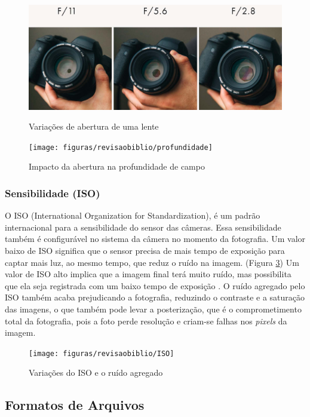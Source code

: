 \begin{figure}[!htb]
	\centering
	\caption{Variações de abertura de uma lente}
	\includegraphics[width=0.7\linewidth]{figuras/revisaobiblio/abertura}
	\label{fig:abertura}
\end{figure}

\begin{figure}[h]
	\centering
	\caption{Impacto da abertura na profundidade de campo}
	\texttt{[image: figuras/revisaobiblio/profundidade]}
	\label{fig:profundidade}
\end{figure}

\subsubsection{Sensibilidade (ISO)}


O ISO (International Organization for Standardization), é um padrão internacional para a sensibilidade do sensor das câmeras. Essa sensibilidade também é configurável no sistema da câmera no momento da fotografia. Um valor baixo de ISO significa que o sensor precisa de mais tempo de exposição para captar mais luz, ao mesmo tempo, que reduz o ruído na imagem. (Figura \ref{fig:iso})
Um valor de ISO alto implica que a imagem final terá muito ruído, mas possibilita que ela seja registrada com um baixo tempo de exposição \cite{book:bbcsky}. O ruído agregado pelo ISO também acaba prejudicando a fotografia, reduzindo o contraste e a saturação das imagens, o que também pode levar a posterização, que é o comprometimento total da fotografia, pois a foto perde resolução e criam-se falhas nos \textit{pixels} da imagem.


\begin{figure}[!htb]
	\centering
	\caption{Variações do ISO e o ruído agregado}
	\texttt{[image: figuras/revisaobiblio/ISO]}
	\label{fig:iso}
\end{figure}

\subsection{Formatos de Arquivos}

